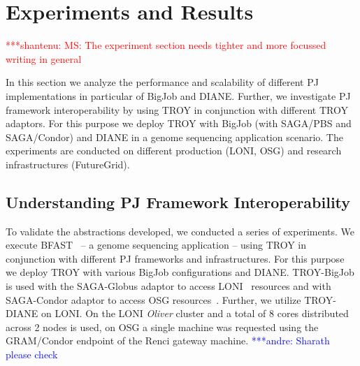 \documentclass[conference,final]{IEEEtran}
\newcommand{\jhanote}[1]{ {\textcolor{red} { ***shantenu: #1 }}}
\newcommand{\alnote}[1]{ {\textcolor{blue} { ***andre: #1 }}}
\newcommand{\alnote}[1]{}
\newcommand{\jhanote}[1]{}
\newcommand{\upp}{\vspace*{-0.5em}}
\begin{document}
\upp

\section{Experiments and Results\upp\upp}
\label{sec:exp_res}

\jhanote{MS: The experiment section needs tighter and more focussed
  writing in general}

In this section we analyze the performance and scalability of
different PJ implementations in particular of BigJob and
DIANE. Further, we investigate PJ framework interoperability by using
TROY in conjunction with different TROY adaptors. For this purpose we
deploy TROY with BigJob (with SAGA/PBS and SAGA/Condor) and DIANE in a
genome sequencing application scenario. The experiments are conducted
on different production (LONI, OSG) and research infrastructures
(FutureGrid).

\subsection{Understanding PJ Framework Interoperability\upp\upp}

To validate the abstractions developed, we conducted a series of
experiments. We execute BFAST~\cite{bfast2009} -- a genome sequencing
application -- using TROY in conjunction with different PJ frameworks
and infrastructures. For this purpose we deploy TROY with various
BigJob configurations and DIANE. TROY-BigJob is used with the
SAGA-Globus adaptor to access LONI~\cite{loni} resources and with
SAGA-Condor adaptor to access OSG
resources~\cite{1742-6596-78-1-012057}.  Further, we utilize
TROY-DIANE on LONI. On the LONI \textit{Oliver} cluster and a total of 8 cores
distributed across 2 nodes is used, on OSG a single machine was
requested using the GRAM/Condor endpoint of the Renci gateway machine.
\alnote{Sharath please check}
\end{document}
